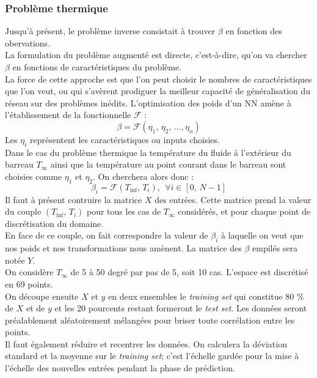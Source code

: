 \documentclass[a4paper,12pt]{article}
\newcommand{\bepar}[1]{
	\left( #1 \right)  
}
\newcommand{\becro}[1]{
	\left[ #1 \right]  
}
\newcommand{\tinf}{$T_\infty$}
\newcommand\bk{\color{black}}
\newcommand\dsb{\color{dsb}}
\newcommand{\cad}{c'est-à-dire}
\numberwithin{equation}{section} %
\begin{document}
\dsb \subsubsection{Problème thermique} \bk
\noindent Jusqu'à présent, le problème inverse consistait à trouver $\beta$ en fonction des obervations. \\
La formulation du problème augmenté est directe, \cad  $ $, qu'on va chercher $\beta$ en fonctions de caractéristiques du problème.\\
La force de cette approche est que l'on peut choisir le nombres de caractéristiques que l'on veut, ou qui s'avèrent prodiguer la meilleur capacité de généralisation du réseau sur des problèmes inédits. L'optimisation des poids d'un NN amène à l'établissement de la fonctionnelle $\mathcal{F}$ : 
\begin{equation}
\beta = \mathcal{F}\bepar{\eta_1,\,\eta_2,\, ...,\eta_n}
\end{equation}
Les $\eta_i$ représentent les caractéristiques ou inputs choisies.\\
Dans le cas du problème thermique la température du fluide à l'extérieur du barreau \tinf $ $ ainsi que la température au point courant dans le barreau sont choisies comme $\eta_1$ et $\eta_2$. On cherchera alors donc : 
\begin{equation}
\beta_i = \mathcal{F}\bepar{T_{\text{inf}}, \, T_i}, \ \ \forall i \in \becro{0,\, N-1} 
\end{equation}
Il faut à présent contruire la matrice $X$ des entrées. Cette matrice prend la valeur du couple $\bepar{T_{\text{inf}}, \, T_i}$ pour tous les cas de \tinf $ $ considérés, et pour chaque point de discrétisation du domaine.\\
En face de ce couple, on fait correspondre la valeur de $\beta_i$ à laquelle on veut que nos poids et nos transformations nous amènent. La matrice des $\beta$ empilés sera notée $Y$.\\

\noindent On considère \tinf $ $ de 5 à 50 degré par pas de 5, soit 10 cas. L'espace est discrétisé en 69 points.\\
On découpe ensuite $X$ et $y$ en deux ensembles le \textit{training set} qui constitue 80 \% de $X$ et de $y$ et les 20 pourcents restant formeront le \textit{test set}. Les données seront préalablement aléatoirement mélangées pour briser toute corrélation entre les points.\\
Il faut également réduire et recentrer les données. On calculera la déviation standard et la moyenne sur le \textit{training set}; c'est l'échelle gardée pour la mise à l'échelle des nouvelles entrées pendant la phase de prédiction.\\
\end{document}
